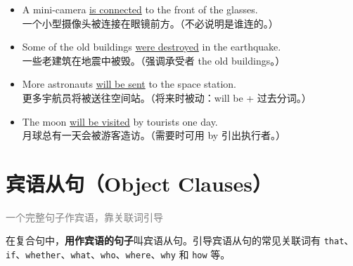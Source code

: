 \documentclass[11pt,a4paper]{ctexart}
\begin{document}
\begin{itemize}[leftmargin=1.4em]
\item A mini-camera \underline{is connected} to the front of the glasses.\\ 一个小型摄像头被连接在眼镜前方。（不必说明是谁连的。）
\item Some of the old buildings \underline{were destroyed} in the earthquake.\\ 一些老建筑在地震中被毁。（强调承受者 the old buildings。）
\item More astronauts \underline{will be sent} to the space station.\\ 更多宇航员将被送往空间站。（将来时被动：will be + 过去分词。）
\item The moon \underline{will be visited} by tourists one day.\\ 月球总有一天会被游客造访。（需要时可用 by 引出执行者。）
\end{itemize}

\begin{center}\end{center}

\section{宾语从句（Object Clauses）}
\noindent\textcolor{gray}{一个完整句子作宾语，靠关联词引导}\par\smallskip
在复合句中，\textbf{用作宾语的句子}叫宾语从句。引导宾语从句的常见关联词有 \texttt{that}、\texttt{if}、\texttt{whether}、\texttt{what}、\texttt{who}、\texttt{where}、\texttt{why} 和 \texttt{how} 等。
\end{document}
